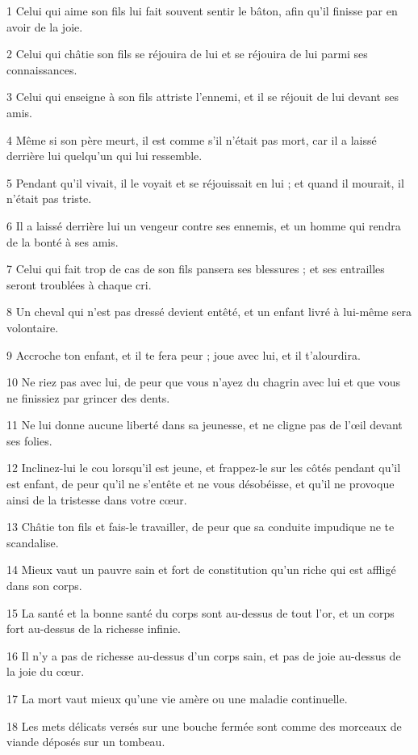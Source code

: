 \par 1 Celui qui aime son fils lui fait souvent sentir le bâton, afin qu'il finisse par en avoir de la joie.
\par 2 Celui qui châtie son fils se réjouira de lui et se réjouira de lui parmi ses connaissances.
\par 3 Celui qui enseigne à son fils attriste l'ennemi, et il se réjouit de lui devant ses amis.
\par 4 Même si son père meurt, il est comme s'il n'était pas mort, car il a laissé derrière lui quelqu'un qui lui ressemble.
\par 5 Pendant qu'il vivait, il le voyait et se réjouissait en lui ; et quand il mourait, il n'était pas triste.
\par 6 Il a laissé derrière lui un vengeur contre ses ennemis, et un homme qui rendra de la bonté à ses amis.
\par 7 Celui qui fait trop de cas de son fils pansera ses blessures ; et ses entrailles seront troublées à chaque cri.
\par 8 Un cheval qui n'est pas dressé devient entêté, et un enfant livré à lui-même sera volontaire.
\par 9 Accroche ton enfant, et il te fera peur ; joue avec lui, et il t'alourdira.
\par 10 Ne riez pas avec lui, de peur que vous n'ayez du chagrin avec lui et que vous ne finissiez par grincer des dents.
\par 11 Ne lui donne aucune liberté dans sa jeunesse, et ne cligne pas de l'œil devant ses folies.
\par 12 Inclinez-lui le cou lorsqu'il est jeune, et frappez-le sur les côtés pendant qu'il est enfant, de peur qu'il ne s'entête et ne vous désobéisse, et qu'il ne provoque ainsi de la tristesse dans votre cœur.
\par 13 Châtie ton fils et fais-le travailler, de peur que sa conduite impudique ne te scandalise.
\par 14 Mieux vaut un pauvre sain et fort de constitution qu'un riche qui est affligé dans son corps.
\par 15 La santé et la bonne santé du corps sont au-dessus de tout l'or, et un corps fort au-dessus de la richesse infinie.
\par 16 Il n'y a pas de richesse au-dessus d'un corps sain, et pas de joie au-dessus de la joie du cœur.
\par 17 La mort vaut mieux qu'une vie amère ou une maladie continuelle.
\par 18 Les mets délicats versés sur une bouche fermée sont comme des morceaux de viande déposés sur un tombeau.
